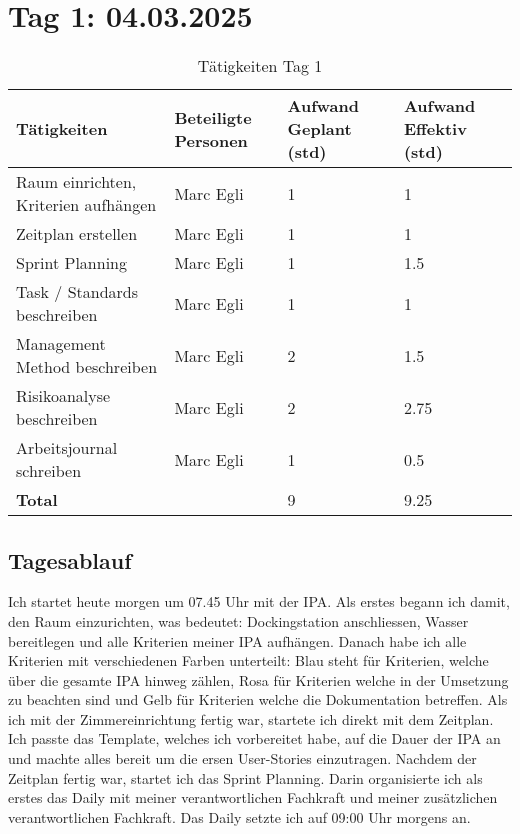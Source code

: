 \section{Tag 1: 04.03.2025}
\begin{table}[H]
    \begin{tabular}{|L{0.4\textwidth}|C{60pt}|C{60pt}|C{60pt}|}
        \hline
        \color{white}Tätigkeiten & \color{white}Beteiligte \color{white}Personen & \color{white}Aufwand Geplant (std) & \color{white}Aufwand Effektiv (std) \\
        \hline
         Raum einrichten, Kriterien aufhängen & Marc Egli & 1 & 1 \\
        \hline
        Zeitplan erstellen & Marc Egli & 1 & 1 \\
        \hline
        Sprint Planning & Marc Egli & 1 & 1.5 \\
        \hline
        Task / Standards beschreiben & Marc Egli & 1 & 1 \\
        \hline
        Management Method beschreiben & Marc Egli & 2 & 1.5 \\
        \hline
        Risikoanalyse beschreiben & Marc Egli & 2 & 2.75 \\
        \hline
        Arbeitsjournal schreiben & Marc Egli & 1 & 0.5 \\
        \hline
        \textbf{Total} &  & 9 & 9.25 \\
        \hline
    \end{tabular}
    \caption{Tätigkeiten Tag 1}
\end{table}

\subsection*{Tagesablauf}
Ich startet heute morgen um 07.45 Uhr mit der IPA. Als erstes begann ich damit, den Raum einzurichten, was bedeutet: 
Dockingstation anschliessen, Wasser bereitlegen und alle Kriterien meiner IPA aufhängen. Danach habe ich alle Kriterien mit verschiedenen
Farben unterteilt: Blau steht für Kriterien, welche über die gesamte IPA hinweg zählen, Rosa für Kriterien welche in der Umsetzung zu beachten sind und 
Gelb für Kriterien welche die Dokumentation betreffen. Als ich mit der Zimmereinrichtung fertig war, startete ich direkt mit dem Zeitplan. Ich passte das Template,
welches ich vorbereitet habe, auf die Dauer der IPA an und machte alles bereit um die ersen User-Stories einzutragen.  Nachdem der Zeitplan fertig war, startet ich das Sprint Planning.
Darin organisierte ich als erstes das Daily mit meiner verantwortlichen Fachkraft und meiner zusätzlichen verantwortlichen Fachkraft. Das Daily setzte ich auf
09:00 Uhr morgens an. 

